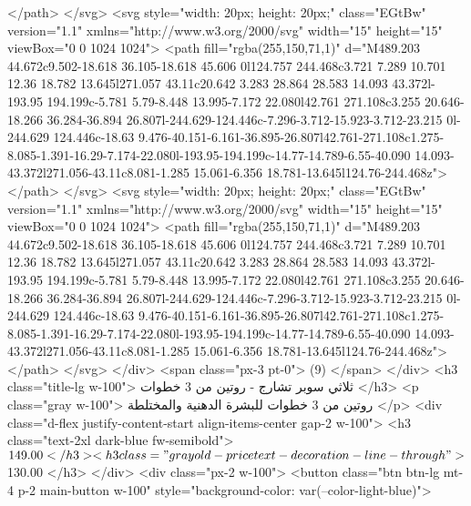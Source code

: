                     </path>
                  </svg>
                  <svg style="width: 20px; height: 20px;" class="EGtBw" version="1.1"
                    xmlns="http://www.w3.org/2000/svg" width="15" height="15" viewBox="0 0 1024 1024">
                    <path fill="rgba(255,150,71,1)"
                      d="M489.203 44.672c9.502-18.618 36.105-18.618 45.606 0l124.757 244.468c3.721 7.289 10.701 12.36 18.782 13.645l271.057 43.11c20.642 3.283 28.864 28.583 14.093 43.372l-193.95 194.199c-5.781 5.79-8.448 13.995-7.172 22.080l42.761 271.108c3.255 20.646-18.266 36.284-36.894 26.807l-244.629-124.446c-7.296-3.712-15.923-3.712-23.215 0l-244.629 124.446c-18.63 9.476-40.151-6.161-36.895-26.807l42.761-271.108c1.275-8.085-1.391-16.29-7.174-22.080l-193.95-194.199c-14.77-14.789-6.55-40.090 14.093-43.372l271.056-43.11c8.081-1.285 15.061-6.356 18.781-13.645l124.76-244.468z">
                    </path>
                  </svg>
                  <svg style="width: 20px; height: 20px;" class="EGtBw" version="1.1"
                    xmlns="http://www.w3.org/2000/svg" width="15" height="15" viewBox="0 0 1024 1024">
                    <path fill="rgba(255,150,71,1)"
                      d="M489.203 44.672c9.502-18.618 36.105-18.618 45.606 0l124.757 244.468c3.721 7.289 10.701 12.36 18.782 13.645l271.057 43.11c20.642 3.283 28.864 28.583 14.093 43.372l-193.95 194.199c-5.781 5.79-8.448 13.995-7.172 22.080l42.761 271.108c3.255 20.646-18.266 36.284-36.894 26.807l-244.629-124.446c-7.296-3.712-15.923-3.712-23.215 0l-244.629 124.446c-18.63 9.476-40.151-6.161-36.895-26.807l42.761-271.108c1.275-8.085-1.391-16.29-7.174-22.080l-193.95-194.199c-14.77-14.789-6.55-40.090 14.093-43.372l271.056-43.11c8.081-1.285 15.061-6.356 18.781-13.645l124.76-244.468z">
                    </path>
                  </svg>
                </div>
                <span class="px-3 pt-0"> (9) </span>
              </div>
              <h3 class="title-lg w-100">
                ثلاثي سوبر تشارج - روتين من 3 خطوات
              </h3>
              <p class="gray w-100">
                روتين من 3 خطوات للبشرة الدهنية والمختلطة
              </p>
              <div class="d-flex justify-content-start align-items-center gap-2 w-100">
                <h3 class="text-2xl dark-blue fw-semibold">$149.00</h3>
                <h3 class="gray old-price text-decoration-line-through">
                  $130.00
                </h3>
              </div>
              <div class="px-2 w-100">
                <button class="btn btn-lg mt-4 p-2 main-button w-100"
                  style="background-color: var(--color-light-blue)">
